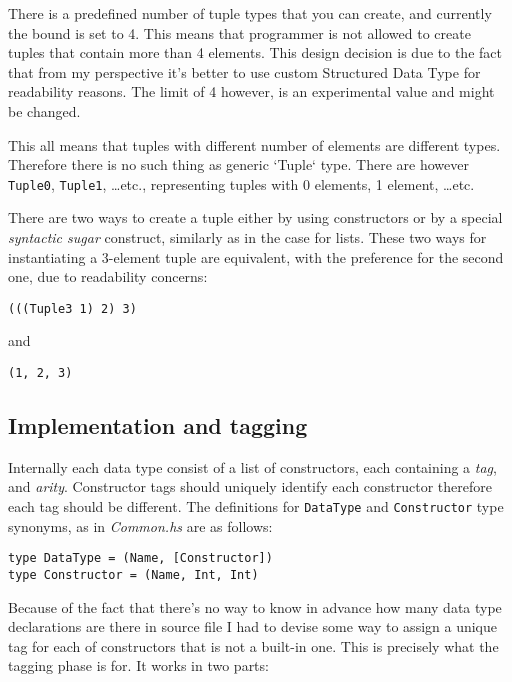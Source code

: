 \documentclass[12pt,a4paper]{report}
\begin{document}
There is a predefined number of tuple types that you can create, and currently
the bound is set to 4. This means that programmer is not allowed to create
tuples that contain more than 4 elements. This design decision is due to the
fact that from my perspective it's better to use custom Structured Data Type
for readability reasons. The limit of 4 however, is an experimental value and
might be changed.

This all means that tuples with different number of elements are different
types. Therefore there is no such thing as generic `Tuple` type. There are
however \texttt{Tuple0}, \texttt{Tuple1}, \ldots etc., representing tuples with
0 elements, 1 element, \ldots etc.

There are two ways to create a tuple either by using constructors or by a
special \textit{syntactic sugar} construct, similarly as in the case for lists.
These two ways for instantiating a 3-element tuple are equivalent, with the
preference for the second one, due to readability concerns:

\hspace*{-1.5in}
\begin{lstlisting}[style=haskell]
(((Tuple3 1) 2) 3)
\end{lstlisting}
and

\hspace*{-1.5in}
\begin{lstlisting}[style=haskell]
(1, 2, 3)
\end{lstlisting}

\subsection{Implementation and tagging}
Internally each data type consist of a list of constructors, each containing a
\textit{tag}, and \textit{arity}. Constructor tags should uniquely identify
each constructor therefore each tag should be different. The definitions
for \texttt{DataType} and \texttt{Constructor} type synonyms, as in
\textit{Common.hs} are as follows:

\hspace*{-1.5in}
\begin{lstlisting}[style=haskell]
type DataType = (Name, [Constructor])
type Constructor = (Name, Int, Int)
\end{lstlisting}

Because of the fact that there's no way to know in advance how many data type
declarations are there in source file I had to devise some way to assign a
unique tag for each of constructors that is not a built-in one. This is
precisely what the tagging phase is for. It works in two parts:
\end{document}

